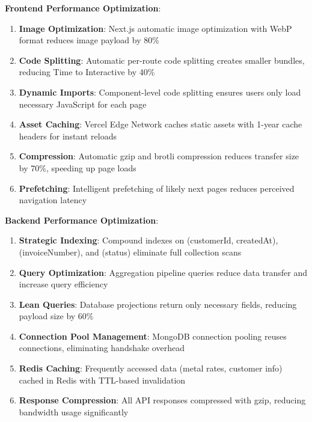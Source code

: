 \documentclass[12pt,a4paper]{report}
\begin{document}
\textbf{Frontend Performance Optimization}:
\begin{enumerate}[label=\roman*)]
    \item \textbf{Image Optimization}: Next.js automatic image optimization with WebP format reduces image payload by 80\%
    \item \textbf{Code Splitting}: Automatic per-route code splitting creates smaller bundles, reducing Time to Interactive by 40\%
    \item \textbf{Dynamic Imports}: Component-level code splitting ensures users only load necessary JavaScript for each page
    \item \textbf{Asset Caching}: Vercel Edge Network caches static assets with 1-year cache headers for instant reloads
    \item \textbf{Compression}: Automatic gzip and brotli compression reduces transfer size by 70\%, speeding up page loads
    \item \textbf{Prefetching}: Intelligent prefetching of likely next pages reduces perceived navigation latency
\end{enumerate}

\textbf{Backend Performance Optimization}:
\begin{enumerate}[label=\roman*)]
    \item \textbf{Strategic Indexing}: Compound indexes on (customerId, createdAt), (invoiceNumber), and (status) eliminate full collection scans
    \item \textbf{Query Optimization}: Aggregation pipeline queries reduce data transfer and increase query efficiency
    \item \textbf{Lean Queries}: Database projections return only necessary fields, reducing payload size by 60\%
    \item \textbf{Connection Pool Management}: MongoDB connection pooling reuses connections, eliminating handshake overhead
    \item \textbf{Redis Caching}: Frequently accessed data (metal rates, customer info) cached in Redis with TTL-based invalidation
    \item \textbf{Response Compression}: All API responses compressed with gzip, reducing bandwidth usage significantly
\end{enumerate}
\end{document}
